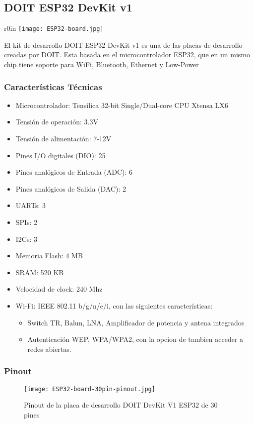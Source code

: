 \documentclass[../informe_krapp.tex]{subfiles}
\begin{document}
\clearpage

\subsection{DOIT ESP32 DevKit v1}
\begin{wrapfigure}{r}{0in}
	\centering
	\texttt{[image: ESP32-board.jpg]}
\end{wrapfigure}
El kit de desarrollo DOIT ESP32 DevKit v1 es una de las placas de desarrollo creadas por
DOIT. Esta basada en el microcontrolador ESP32, que en un mismo chip tiene soporte
para WiFi, Bluetooth, Ethernet y Low-Power

\subsubsection{Características Técnicas}
\begin{itemize}
	\item Microcontrolador: Tensilica 32-bit Single/Dual-core CPU Xtensa LX6
	\item Tensión de operación: 3.3V
	\item Tensión de alimentación: 7-12V
	\item Pines I/O digitales (DIO): 25
	\item Pines analógicos de Entrada (ADC): 6
	\item Pines analógicos de Salida (DAC): 2
	\item UARTs: 3
	\item SPIs: 2
	\item I2Cs: 3
	\item Memoria Flash: 4 MB
	\item SRAM: 520 KB
	\item Velocidad de clock: 240 Mhz
	\item Wi-Fi: IEEE 802.11 b/g/n/e/i, con las siguientes características:
	      \begin{itemize}
		      \item Switch TR, Balun, LNA, Amplificador de potencia y antena integrados
		      \item Autenticación WEP, WPA/WPA2, con la opcion de tambien acceder a redes abiertas.
	      \end{itemize}
\end{itemize}

\clearpage

\subsubsection{Pinout}
\begin{figure}[H]
	\texttt{[image: ESP32-board-30pin-pinout.jpg]}
	\centering
	\caption{Pinout de la placa de desarrollo DOIT DevKit V1 ESP32 de 30 pines}
\end{figure}
\end{document}
